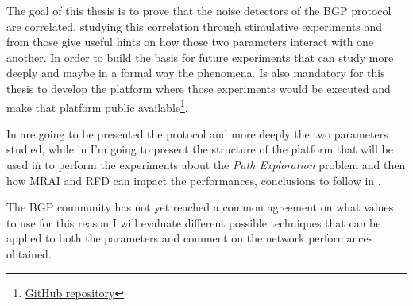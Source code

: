 
The goal of this thesis is to prove that the noise detectors of the \ac{BGP}
protocol are correlated, studying this correlation through stimulative experiments
and from those give useful hints on how those two parameters interact with one another.
In order to build the basis for future experiments that can study more deeply
and maybe in a formal way the phenomena.
Is also mandatory for this thesis to develop the platform where those experiments
would be executed and make that platform public
available\footnote{\href{https://github.com/tiamilani/BGPFSM}{GitHub repository}}.

In  are going to be presented the protocol and more deeply
the two parameters studied, while in  I'm going to present
the structure of the platform that will be used in 
to perform the experiments about the \textit{Path Exploration} problem and then
how \ac{MRAI} and \ac{RFD} can impact the performances, conclusions to follow
in .

The \ac{BGP} community has not yet reached a common agreement on what values
to use for this reason I will evaluate different possible techniques that can
be applied to both the parameters and comment on the network performances obtained.


